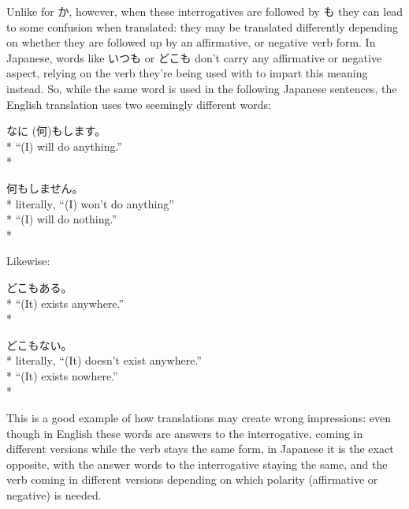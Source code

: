 \documentclass[11pt, b5paper, twoside, openright, onecolumn]{book}
\makeatletter
\newcommand*{\rubystack}[2]{{\relscale{0.5}%
  \begin{tabular}[b]{@{}c@{}}%
    {#1}\\%
   {\textscale{2}{#2}}%
  \end{tabular}}%
}
\DeclareRobustCommand*{\ruby}[2]{%
  \mbox{%
    \setlength{\parskip}{0ex}%
    \BeginAccSupp{method=pdfstringdef,ActualText={#1}}%
      \rubystack{\phantom{#2}}{#1}%
      \llap{%
        \rubystack{#2}{\phantom{#1}}%
      }%
    \EndAccSupp{}%
  }%
}
\renewcommand*{\ruby}[2]{#2 (#1)}%
\newenvironment{exampleblock}{
\setlength{\parindent}{0.6in}
\begin{minipage}[t]{\dimexpr\textwidth-\parindent}}
{\end{minipage}}
\makeatother
\begin{document}
Unlike for か‚ however‚ when these interrogatives are followed by も they can lead to some confusion when translated: they may be translated differently depending on whether they are followed up by an affirmative‚ or negative verb form. In Japanese‚ words like いつも or どこも don’t carry any affirmative or negative aspect‚ relying on the verb they’re being used with to impart this meaning instead. So‚ while the same word is used in the following Japanese sentences‚ the English translation uses two seemingly different words:

\vspace{0.4cm}
\begin{exampleblock}
\ruby{何}{なに}もします。 \\* 
“(I) will do anything.” \\* 
\end{exampleblock}
\vspace{0.2cm}

\begin{exampleblock}
何もしません。 \\* 
literally‚ “(I) won’t do anything” \\* 
“(I) will do nothing.” \\* 
\end{exampleblock}
\vspace{0.2cm}

Likewise:

\vspace{0.4cm}
\begin{exampleblock}
どこもある。 \\* 
“(It) exists anywhere.” \\* 
\end{exampleblock}
\vspace{0.2cm}

\begin{exampleblock}
どこもない。 \\* 
literally‚ “(It) doesn’t exist anywhere.” \\* 
“(It) exists nowhere.” \\* 
\end{exampleblock}
\vspace{0.2cm}

This is a good example of how translations may create wrong impressions: even though in English these words are answers to the interrogative‚ coming in different versions while the verb stays the same form‚ in Japanese it is the exact opposite‚ with the answer words to the interrogative staying the same‚ and the verb coming in different versions depending on which polarity (affirmative or negative) is needed.
\end{document}
